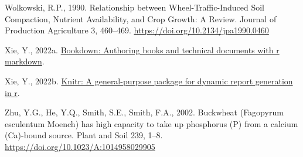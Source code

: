 \documentclass[
  12pt,
]{article}
\newlength{\cslhangindent}
\newlength{\cslentryspacingunit} %
\newenvironment{CSLReferences}[2] %
 {%
  \setlength{\parindent}{0pt}
  \ifodd #1
  \let\oldpar\par
  \def\par{\hangindent=\cslhangindent\oldpar}
  \fi
  \setlength{\parskip}{#2\cslentryspacingunit}
 }%
 {}
\begin{document}
\begin{CSLReferences}{1}{0}
\leavevmode{}%
Wolkowski, R.P., 1990. Relationship between {Wheel-Traffic-Induced Soil Compaction}, {Nutrient Availability}, and {Crop Growth}: {A Review}. Journal of Production Agriculture 3, 460--469. \url{https://doi.org/10.2134/jpa1990.0460}

\leavevmode{}%
Xie, Y., 2022a. \href{https://github.com/rstudio/bookdown}{Bookdown: Authoring books and technical documents with r markdown}.

\leavevmode{}%
Xie, Y., 2022b. \href{https://yihui.org/knitr/}{Knitr: A general-purpose package for dynamic report generation in r}.

\leavevmode{}%
Zhu, Y.G., He, Y.Q., Smith, S.E., Smith, F.A., 2002. Buckwheat ({Fagopyrum} esculentum {Moench}) has high capacity to take up phosphorus ({P}) from a calcium ({Ca})-bound source. Plant and Soil 239, 1--8. \url{https://doi.org/10.1023/A:1014958029905}

\end{CSLReferences}
\end{document}
